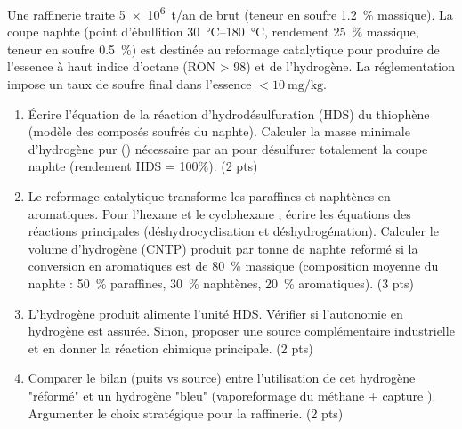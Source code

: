\documentclass[11pt]{article}
\begin{document}
\begin{exercice}
Une raffinerie traite \SI{5e6}{\tonne/an} de brut (teneur en soufre \SI{1.2}{\%} massique). La coupe naphte (point d'ébullition \SI{30}{\celsius}--\SI{180}{\celsius}, rendement \SI{25}{\%} massique, teneur en soufre \SI{0.5}{\%}) est destinée au reformage catalytique pour produire de l'essence à haut indice d'octane (RON > 98) et de l'hydrogène. La réglementation impose un taux de soufre final dans l'essence $< \SI{10}{\mg\per\kg}$.

\begin{enumerate}
\item Écrire l'équation de la réaction d'hydrodésulfuration (HDS) du thiophène  (modèle des composés soufrés du naphte). Calculer la masse minimale d'hydrogène pur () nécessaire par an pour désulfurer totalement la coupe naphte (rendement HDS = 100\%). \hfill (2 pts)
\item Le reformage catalytique transforme les paraffines et naphtènes en aromatiques. Pour l'hexane  et le cyclohexane , écrire les équations des réactions principales (déshydrocyclisation et déshydrogénation). Calculer le volume d'hydrogène (CNTP) produit par tonne de naphte reformé si la conversion en aromatiques est de \SI{80}{\%} massique (composition moyenne du naphte : \SI{50}{\%} paraffines, \SI{30}{\%} naphtènes, \SI{20}{\%} aromatiques). \hfill (3 pts)
\item L'hydrogène produit alimente l'unité HDS. Vérifier si l'autonomie en hydrogène est assurée. Sinon, proposer une source complémentaire industrielle et en donner la réaction chimique principale. \hfill (2 pts)
\item Comparer le bilan  (puits vs source) entre l'utilisation de cet hydrogène "réformé" et un hydrogène "bleu" (vaporeformage du méthane + capture ). Argumenter le choix stratégique pour la raffinerie. \hfill (2 pts)
\end{enumerate}
\end{exercice}
\end{document}
